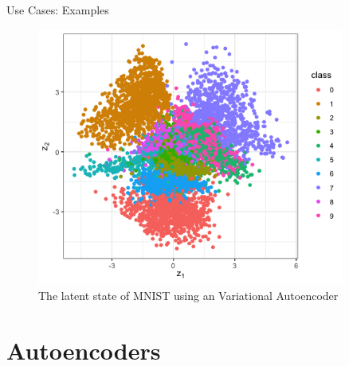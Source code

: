 \documentclass[10pt]{beamer}
\begin{document}
\begin{frame}{Use Cases: Examples}

\begin{figure}[h]
\centering
\includegraphics[width=0.9\textwidth]{fig/MNIST_VAE_latent.png}
\caption{The latent state of MNIST using an Variational Autoencoder}
\end{figure}

\end{frame}



\section{Autoencoders}
\end{document}
